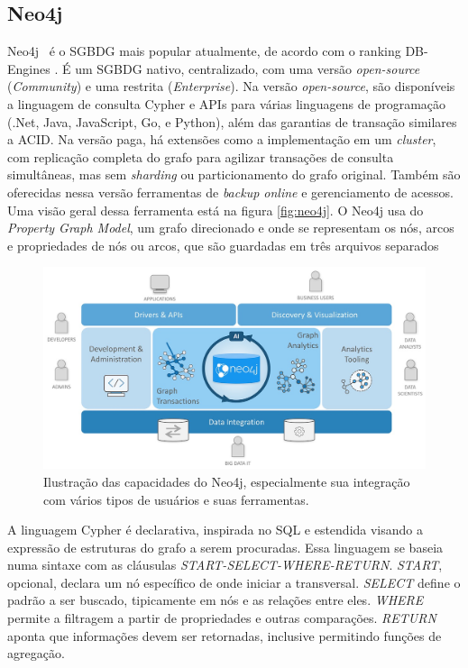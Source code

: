 \documentclass[conference]{IEEEtran}
\begin{document}
\subsection{Neo4j}

Neo4j~\cite{neo4j} é o SGBDG mais popular atualmente, de acordo com o ranking DB-Engines \cite{db_engines}. É um SGBDG nativo, centralizado, com uma versão \emph{open-source} (\emph{Community}) e uma restrita (\emph{Enterprise}). Na versão \emph{open-source}, são disponíveis a linguagem de consulta Cypher e APIs para várias linguagens de programação (.Net, Java, JavaScript, Go, e Python), além das garantias de transação similares a ACID. Na versão paga, há extensões como a implementação em um \emph{cluster}, com replicação completa do grafo para agilizar transações de consulta simultâneas, mas sem \emph{sharding} ou particionamento do grafo original. Também são oferecidas nessa versão ferramentas de \emph{backup online} e gerenciamento de acessos. Uma visão geral dessa ferramenta está na figura \ref{fig:neo4j}. O Neo4j usa do \emph{Property Graph Model}, um grafo direcionado e onde se representam os nós, arcos e propriedades de nós ou arcos, que são guardadas em três arquivos separados

\begin{figure}[htbp]
\centerline{\includegraphics[width=0.9\linewidth]{img/neo4j/neo4j_graph_platform.jpg}}
\caption{Ilustração das capacidades do Neo4j, especialmente sua integração com vários tipos de usuários e suas ferramentas.}\label{fig:neo4j}
\label{fig}
\end{figure}

A linguagem Cypher é declarativa, inspirada no SQL e estendida visando a expressão de estruturas do grafo a serem procuradas. Essa linguagem se baseia numa sintaxe com as cláusulas \emph{START-SELECT-WHERE-RETURN}. \emph{START}, opcional, declara um nó específico de onde iniciar a transversal. \emph{SELECT} define o padrão a ser buscado, tipicamente em nós e as relações entre eles. \emph{WHERE} permite a filtragem a partir de propriedades e outras comparações. \emph{RETURN} aponta que informações devem ser retornadas, inclusive permitindo funções de agregação.
\end{document}
